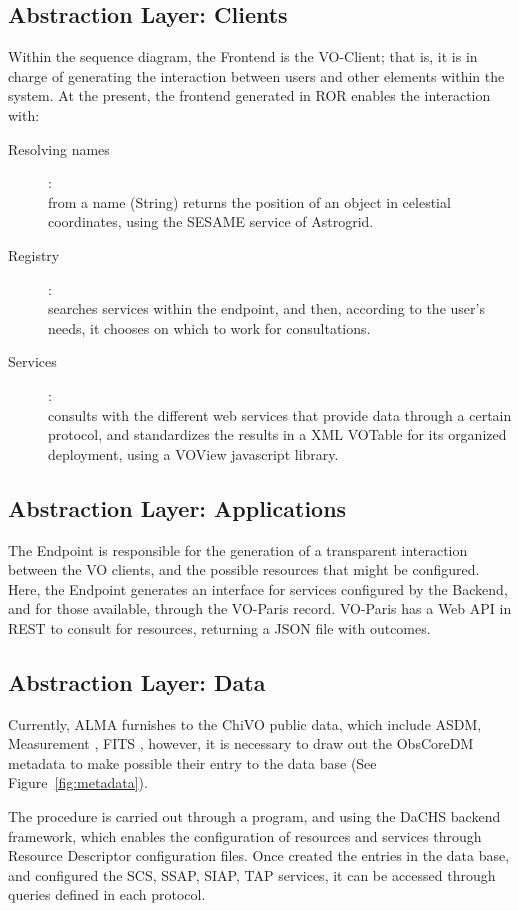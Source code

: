 \documentclass[]{spie}
\begin{document}
\subsection{Abstraction Layer:  Clients}
Within the sequence diagram, the Frontend is the VO-Client; that is, it is in charge of generating the interaction between users and other elements within the system.
At the present, the frontend generated in ROR enables the interaction with:
\begin{description}
    \item[Resolving names]:\hfill \\
        from a name (String) returns the position of an object in celestial coordinates, using the SESAME service of Astrogrid.
    \item[Registry]: \hfill \\
        searches services within the endpoint, and then, according to the user's needs, it chooses on which to work for consultations.
    \item[Services]: \hfill \\
        consults with the different web services that provide data through a certain protocol, and standardizes the results in a XML VOTable for its organized deployment, using a VOView javascript library.
\end{description}

\subsection{Abstraction Layer:  Applications}
The Endpoint is responsible for the generation of a transparent interaction between the VO clients, and the possible resources that might be configured.  Here, the Endpoint generates an interface for services configured by the Backend, and for those available, through the VO-Paris record.  VO-Paris has a Web API in REST to consult for resources, returning a JSON file with outcomes.

\subsection{Abstraction Layer:  Data}
Currently, ALMA furnishes to the ChiVO public data, which include ASDM, Measurement \cite{petry2012analysing}, FITS \cite{wells1981fits}, however, it is necessary to draw out the ObsCoreDM metadata to make possible their entry to the data base (See Figure~\ref{fig:metadata}).

The procedure is carried out through a program, and using the DaCHS backend framework, which enables the configuration of resources and services through Resource Descriptor  configuration files.  Once created the entries in the data base, and configured the SCS, SSAP, SIAP, TAP services, it can be accessed through queries defined in each protocol.
\end{document}

